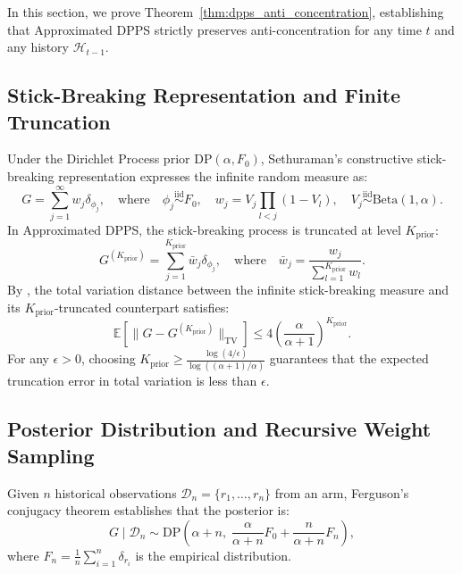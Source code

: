 \documentclass[twoside]{article}
\begin{document}
In this section, we prove Theorem~\ref{thm:dpps_anti_concentration}, establishing that Approximated DPPS strictly preserves anti-concentration for any time $t$ and any history $\mathcal{H}_{t-1}$.

\subsection{Stick-Breaking Representation and Finite Truncation}
Under the Dirichlet Process prior $\text{DP}(\alpha, F_0)$, Sethuraman's constructive stick-breaking representation \citep{sethuraman1994constructive} expresses the infinite random measure as:
\begin{equation}
G = \sum_{j=1}^\infty w_j \delta_{\phi_j}, \quad \text{where} \quad \phi_j \stackrel{\text{iid}}{\sim} F_0, \quad w_j = V_j \prod_{l<j}(1 - V_l), \quad V_j \stackrel{\text{iid}}{\sim} \text{Beta}(1, \alpha).
\end{equation}
In Approximated DPPS, the stick-breaking process is truncated at level $K_{\text{prior}}$:
\begin{equation}
G^{(K_{\text{prior}})} = \sum_{j=1}^{K_{\text{prior}}} \bar{w}_j \delta_{\phi_j}, \quad \text{where} \quad \bar{w}_j = \frac{w_j}{\sum_{l=1}^{K_{\text{prior}}} w_l}.
\end{equation}
By \citet[Theorem 2]{ishwaran2001gibbs}, the total variation distance between the infinite stick-breaking measure and its $K_{\text{prior}}$-truncated counterpart satisfies:
\begin{equation}
\mathbb{E}\left[ \| G - G^{(K_{\text{prior}})} \|_{\text{TV}} \right] \le 4 \left( \frac{\alpha}{\alpha + 1} \right)^{K_{\text{prior}}}.
\label{eq:ishwaran_james_bound}
\end{equation}
For any $\epsilon > 0$, choosing $K_{\text{prior}} \ge \frac{\log(4/\epsilon)}{\log((\alpha+1)/\alpha)}$ guarantees that the expected truncation error in total variation is less than $\epsilon$.

\subsection{Posterior Distribution and Recursive Weight Sampling}
Given $n$ historical observations $\mathcal{D}_n = \{r_1, \dots, r_n\}$ from an arm, Ferguson's conjugacy theorem establishes that the posterior is:
\begin{equation}
G \mid \mathcal{D}_n \sim \text{DP}\left( \alpha + n, \; \frac{\alpha}{\alpha + n} F_0 + \frac{n}{\alpha + n} F_n \right),
\end{equation}
where $F_n = \frac{1}{n} \sum_{i=1}^n \delta_{r_i}$ is the empirical distribution.
\end{document}
